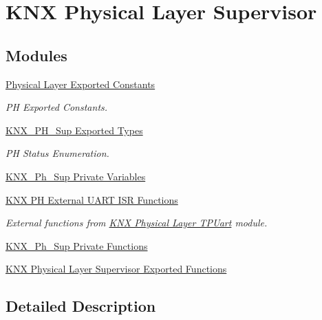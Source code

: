 \hypertarget{group___k_n_x___p_h___sup}{}\section{K\+NX Physical Layer Supervisor}
\label{group___k_n_x___p_h___sup}
\subsection*{Modules}
\begin{DoxyCompactItemize}
\item 
\hyperlink{group___p_h___exported___constants}{Physical Layer Exported Constants}
\begin{DoxyCompactList}\small\item\em PH Exported Constants. \end{DoxyCompactList}\item 
\hyperlink{group___k_n_x___p_h___sup___exported___types}{K\+N\+X\+\_\+\+P\+H\+\_\+\+Sup Exported Types}
\begin{DoxyCompactList}\small\item\em PH Status Enumeration. \end{DoxyCompactList}\item 
\hyperlink{group___k_n_x___p_h___sup___private___variables}{K\+N\+X\+\_\+\+Ph\+\_\+\+Sup Private Variables}
\item 
\hyperlink{group___k_n_x___p_h___sup___external___functions}{K\+N\+X P\+H External U\+A\+R\+T I\+S\+R Functions}
\begin{DoxyCompactList}\small\item\em External functions from \hyperlink{group___k_n_x___p_h___t_p_uart}{K\+NX Physical Layer T\+P\+Uart} module. \end{DoxyCompactList}\item 
\hyperlink{group___k_n_x___p_h___sup___private___functions}{K\+N\+X\+\_\+\+Ph\+\_\+\+Sup Private Functions}
\item 
\hyperlink{group___k_n_x___p_h___sup___exported___functions}{K\+N\+X Physical Layer Supervisor Exported Functions}
\end{DoxyCompactItemize}


\subsection{Detailed Description}
